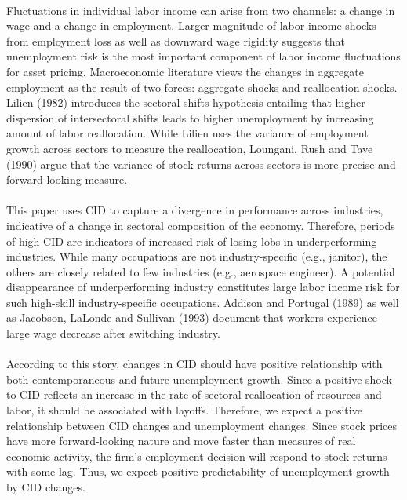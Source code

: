\documentclass[12pt]{article}
\begin{document}
\paragraph{}
Fluctuations in individual labor income can arise from two channels: a change in wage and a change in employment. Larger magnitude of labor income shocks from employment loss as well as downward wage rigidity suggests that unemployment risk is the most important component of labor income fluctuations for asset pricing. Macroeconomic literature views the changes in aggregate employment as the result of two forces: aggregate shocks and reallocation shocks. Lilien (1982) introduces the sectoral shifts hypothesis entailing that higher dispersion of intersectoral shifts leads to higher unemployment by increasing amount of labor reallocation. While Lilien uses the variance of employment growth across sectors to measure the reallocation, Loungani, Rush and Tave (1990) argue that the variance of stock returns across sectors is more precise and forward-looking measure. 
\paragraph{}
This paper uses CID to capture a divergence in performance across industries, indicative of a change in sectoral composition of the economy. Therefore, periods of high CID are indicators of increased risk of losing lobs in underperforming industries. While many occupations are not industry-specific (e.g., janitor), the others are closely related to few industries (e.g., aerospace engineer). A potential disappearance of underperforming industry constitutes large labor income risk for such high-skill industry-specific occupations. Addison and Portugal (1989) as well as Jacobson, LaLonde and Sullivan (1993) document that workers experience large wage decrease after switching industry. 
\paragraph{}
According to this story, changes in CID should have positive relationship with both contemporaneous and future unemployment growth. Since a positive shock to CID reflects an increase in the rate of sectoral reallocation of resources and labor, it should be associated with layoffs. Therefore, we expect a positive relationship between CID changes and unemployment changes. Since stock prices have more forward-looking nature and move faster than measures of real economic activity, the firm's employment decision will respond to stock returns with some lag. Thus, we expect positive predictability of unemployment growth by CID changes.
\end{document}
